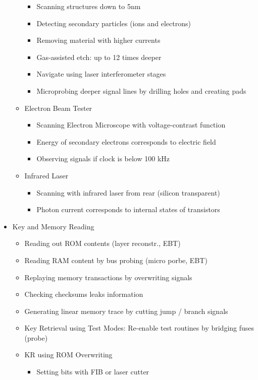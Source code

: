 \documentclass[11pt, paper=a4, twocolumn]{scrartcl}
\begin{document}
\begin{itemize}
\begin{itemize}
\begin{itemize}
							\item Scanning structures down to 5nm
							\item Detecting secondary particles (ions and electrons)
							\item Removing material with higher currents
							\item Gas-assisted etch: up to 12 times deeper
							\item Navigate using laser interferometer stages
							\item Microprobing deeper signal lines by drilling holes and creating pads
						\end{itemize}
					\item Electron Beam Tester
						\begin{itemize}
							\item Scanning Electron Microscope with voltage-contrast function
							\item Energy of secondary electrons corresponds to electric field
							\item Observing signals if clock is below 100 kHz
						\end{itemize}
					\item Infrared Laser
						\begin{itemize}
							\item Scanning with infrared laser from rear (silicon transparent)
							\item Photon current corresponds to internal states of transistors
						\end{itemize}
				\end{itemize}
			\item Key and Memory Reading
				\begin{itemize}
					\item Reading out ROM contents (layer reconstr., EBT)
					\item Reading RAM content by bus probing (micro porbe, EBT)
					\item Replaying memory transactions by overwriting signals
					\item Checking checksums leaks information
					\item Generating linear memory trace by cutting jump / branch signals
					\item Key Retrieval using Test Modes: Re-enable test routines by bridging fuses (probe)
					\item KR using ROM Overwriting
						\begin{itemize}
							\item Setting bits with FIB or laser cutter

\end{itemize}
\end{itemize}
\end{itemize}
\end{document}
